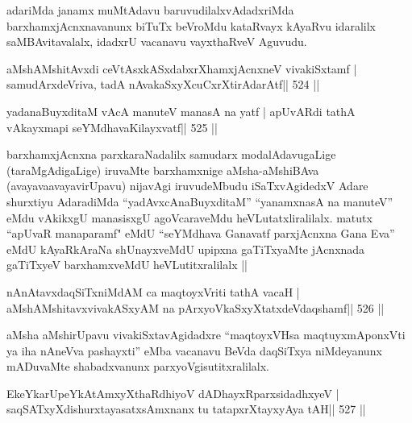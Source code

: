 \begin{artha}
adariMda janamx muMtAdavu baruvudilalxvAdadxriMda barxhamxjAcnxnavanunx biTuTx beVroMdu kataRvayx kAyaRvu idaralilx saMBAvitavalalx, idadxrU vacanavu vayxthaRveV Aguvudu.
\end{artha}




\begin{shl}
aMshAMshitAvxdi ceVtAsxkASxdabxrXhamxjAcnxneV vivakiSxtamf |
samudArxdeVriva, tadA nAvakaSxyXcuCxrXtirAdarAtf\hfill || 524 ||
\end{shl}

\begin{shl}
yadanaBuyxditaM vAcA manuteV manasA na yatf |
apUvARdi tathA vAkayxmapi seYMdhavaKilayxvatf\hfill || 525 ||
\end{shl}

\begin{artha}
barxhamxjAcnxna parxkaraNadalilx samudarx modalAdavugaLige
(taraMgAdigaLige) iruvaMte barxhamxnige aMsha-aMshiBAva 
(avayavaavayavirUpavu) nijavAgi iruvudeMbudu iSaTxvAgidedxV Adare shurxtiyu
AdaradiMda ``yadAvxcAnaBuyxditaM'' ``yanamxnasA na manuteV'' eMdu
vAkikxgU manasisxgU agoVcaraveMdu heVLutatxliralilalx. matutx ``apUvaR
manaparamf" eMdU ``seYMdhava Ganavatf parxjAcnxna Gana Eva'' eMdU
kAyaRkAraNa shUnayxveMdU upipxna gaTiTxyaMte jAcnxnada gaTiTxyeV
barxhamxveMdU heVLutitxralilalx || 
\end{artha}


\begin{shl}
nAnAtavxdaqSiTxniMdAM ca maqtoyxVriti tathA vacaH |
aMshAMshitavxvivakASxyAM na pArxyoVkaSxyXtatxdeVdaqshamf\hfill || 526 ||
\end{shl}

\begin{artha}
aMsha aMshirUpavu vivakiSxtavAgidadxre ``maqtoyxVHsa maqtuyxmAponxVti ya iha nAneVva pashayxti'' eMba vacanavu BeVda daqSiTxya niMdeyanunx mADuvaMte shabadxvanunx parxyoVgisutitxralilalx.
\end{artha}



\begin{shl}
EkeYkarUpeYkAtAmxyXthaRdhiyoV dADhayxRparxsidadhxyeV |
saqSATxyXdishurxtayasatxsAmxnanx tu tatapxrXtayxyAya tAH\hfill || 527 ||
\end{shl}

